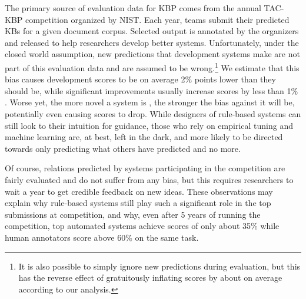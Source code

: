 The primary source of evaluation data for KBP comes from the annual TAC-KBP competition organized by NIST.\@ %
Each year, teams submit their predicted KBs for a given document corpus.
Selected output  is annotated by the organizers and released to help researchers develop better systems.
Unfortunately, under the closed world assumption, new predictions that development systems make are not part of this evaluation data and are assumed to be wrong.\footnote{%
It is also possible to simply ignore new predictions during evaluation, but this has the reverse effect of gratuitously inflating scores by about  on average according to our analysis.}
We estimate that this bias causes development \fone{} scores to be on average 2\% points lower than they should be, while significant improvements usually increase scores by less than 1\% \fone{}.
Worse yet, the more novel a system is , the stronger the bias against it will be, potentially even causing scores to drop.
While designers of rule-based systems can still look to their intuition for guidance, those who rely on empirical tuning and machine learning are, at best, left in the dark, and more likely to be directed towards only predicting what others have predicted and no more.

Of course, relations predicted by systems participating in the competition are fairly evaluated and do not suffer from any bias, but this requires researchers to wait a year to get credible feedback on new ideas.
%
These observations may explain why rule-based systems still play such a significant role in the top submissions at competition, and why, even after 5 years of running the competition, top automated systems achieve scores of only about 35\%\fone{} while human annotators score above 60\%\fone{} on the same task.

